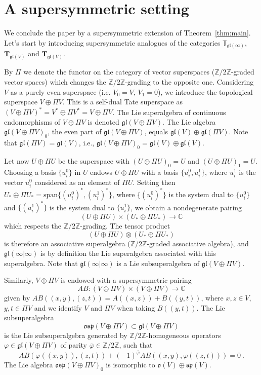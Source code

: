 \documentclass[12pt,reqno]{amsart}
\theoremstyle{definition}
\theoremstyle{remark}
\begin{document}
	\section{A supersymmetric setting}

 We conclude the paper by a supersymmetric extension of Theorem~\ref{thm:main}. Let's start by introducing supersymmetric analogues of the categories $\mathbb{T}_{\mathfrak{gl}(\infty)}$, $\mathbf{T}_{\mathfrak{gl}(V)}$ and $\widehat{{\mathbf T}}_{\mathfrak{gl}(V)}$. 
 
 
By $\Pi$ we denote the functor on the category of vector superspaces ($\mathbb{Z}/2\mathbb{Z}$-graded vector spaces) which changes the  $\mathbb{Z}/2\mathbb{Z}$-grading to the opposite one. Considering $V$ as a purely even superspace (i.e. $V_0 = V$, $V_1 = 0$), we introduce the topological superspace $V\oplus \Pi V$. This is a self-dual Tate superspace as $(V\oplus \Pi V)^\ast = V^\ast \oplus \Pi V^\ast = V \oplus \Pi V$. The Lie superalgebra of continuous endomorphisms of $V\oplus \Pi V$ is denoted $\mathfrak{gl}(V\oplus \Pi V)$. 
The Lie algebra $\mathfrak{gl}(V \oplus \Pi V)_0$, the even part of $\mathfrak{gl}(V \oplus \Pi V)$, equals $\mathfrak{gl}(V)\oplus \mathfrak{gl}(\Pi V)$. Note that $\mathfrak{gl}(\Pi V) = \mathfrak{gl}(V)$, i.e., $\mathfrak{gl}(V \oplus \Pi V)_0 = \mathfrak{gl}(V)\oplus \mathfrak{gl}(V)$.
 
 
 
 
 Let now $U \oplus \Pi U$ be the superspace with $(U \oplus \Pi U)_0 = U$ and $(U \oplus \Pi U)_1 = U$. Choosing a basis $\{u^0 _i\}$ in $U$ endows $U\oplus\Pi U$ with a basis $\{u^0 _i, u^1 _i\}$, where $u^1 _i$ is the vector $u^0 _i$ considered as an element of $\Pi U$.
 Setting then $U_\ast \oplus \Pi U_\ast = \mathrm{span}\{ (u_i ^0)^\ast ,  (u_i ^1)^\ast  \}$, where $\{(u_i ^0)^\ast\}$ is the system dual to $\{u^0 _i\}$ and $\{(u_i ^1)^\ast\}$  is the system dual to $\{u^1 _i\}$, we obtain a nondegenerate pairing 
 \[
 (U \oplus \Pi U) \times (U_\ast \oplus \Pi U_\ast) \rightarrow \mathbb{C}
 \]
 which respects the $\mathbb{Z}/2\mathbb{Z}$-grading.
 The tensor product 
 \[
 (U \oplus \Pi U) \otimes (U_\ast \oplus \Pi U_\ast)
 \]
is therefore an associative superalgebra ($\mathbb{Z}/2\mathbb{Z}$-graded associative algebra), and $\mathfrak{gl}(\infty | \infty)$ is by definition the Lie superalgebra associated with this superalgebra.	
Note that $\mathfrak{gl}(\infty | \infty)$ is a Lie subsuperalgebra of $\mathfrak{gl}(V \oplus \Pi V)$.

Similarly, $V\oplus \Pi V$ is endowed with a supersymmetric pairing
\[
AB: (V \oplus \Pi V) \times (V \oplus \Pi V) \rightarrow \mathbb{C}
\]
given by $AB((x,y), (z,t)) = A((x,z)) + B((y,t))$,
where $x,z\in V$, $y,t\in \Pi V$ and we identify $V$ and $\Pi V$ when taking $B((y,t))$.
The Lie subsuperalgebra
\[
\mathfrak{osp}(V \oplus \Pi V) \subset \mathfrak{gl}(V \oplus \Pi V)
\]
is the Lie subsuperalgebra generated by $\mathbb{Z}/2\mathbb{Z}$-homogeneous operators $\varphi \in \mathfrak{gl}(V \oplus \Pi V)$ of parity $\overline{\varphi}\in \mathbb{Z}/2\mathbb{Z}$, such that
\[
AB(\varphi((x,y)), (z,t)) + (-1)^{\overline{\varphi}}
AB((x,y), \varphi((z,t))) = 0 \ .
\]
The Lie algebra $\mathfrak{osp}(V \oplus \Pi V)_0$ is isomorphic to 
$\mathfrak{o}(V)\oplus \mathfrak{sp}(V)$.
\end{document}
